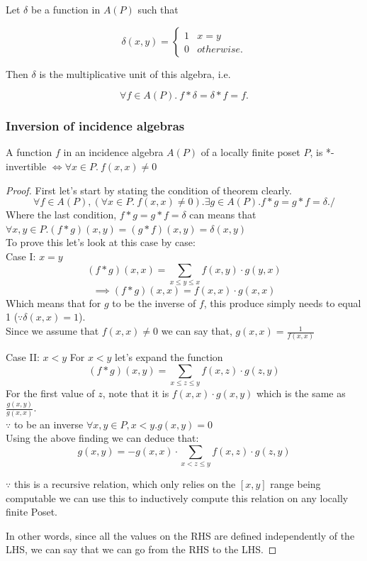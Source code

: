 Let $\delta$ be a function in $A(P)$ such that

\[
  \delta(x, y) = \begin{cases}
    1 & x = y\\
    0 & otherwise.
  \end{cases} 
\]

Then $\delta$ is the multiplicative unit of this algebra, i.e.

$$\forall f \in A(P).~f*\delta = \delta*f = f.$$

\subsubsection{Inversion of incidence algebras}

\begin{theorem}
A function $f$ in an incidence algebra $A(P)$ of a locally finite poset $P$, is *-invertible $\iff \forall x \in P.~f(x, x) \neq 0$
\end{theorem}

\begin{proof}
First let's start by stating the condition of theorem clearly.\\
$$\forall f \in A(P), \left(\forall x \in P.~f(x, x) \neq 0\right). \exists g \in A(P). f * g = g * f = \delta./$$
Where the last condition, $f * g = g * f = \delta$ can means that $\forall x, y \in P. (f * g)(x, y) = (g * f)(x, y) = \delta(x, y)$\\
To prove this let's look at this case by case:\\

Case I: $x = y$
$$(f * g)(x, x) = \sum_{x \le y \le x} f(x, y) \cdot g(y,x)$$
$$\implies (f * g)(x, x) = f(x, x) \cdot g(x, x)$$
Which means that for $g$ to be the inverse of $f$, this produce simply needs to equal 1 ($\because \delta(x, x) = 1$).\\
Since we assume that $f(x, x) \neq 0$ we can say that, $g(x, x) = \frac 1 {f(x, x)}$

Case II: $x < y$
For $x < y$ let's expand the function
$$(f * g)(x, y) = \sum_{x \leq z \leq y} f(x, z) \cdot g(z, y)$$
For the first value of $z$, note that it is $f(x, x) \cdot g(x, y)$ which is the same as $\frac {g(x, y)} {g(x, x)}$.\\

$\because$ to be an inverse $\forall x, y \in P, x < y. g(x, y) = 0$\\
Using the above finding we can deduce that:\\
$$g(x, y) = -g(x, x)\cdot \sum_{x < z \leq y} f(x, z) \cdot g(z, y)$$

$\because$ this is a recursive relation, which only relies on the $[x, y]$ range being computable
we can use this to inductively compute this relation on any locally finite Poset.

In other words, since all the values on the RHS are defined independently of the LHS, we can say that
we can go from the RHS to the LHS.
\end{proof}


